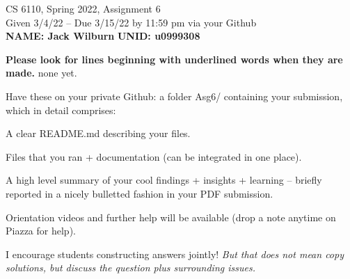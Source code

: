 \documentclass[11pt]{article}
\begin{document}

\newlength{\minpagw}
\settowidth{\minpagw}{\hspace{40em}}

\begin{center}
\begin{large}
  CS 6110, Spring 2022, Assignment 6  \\
  Given 3/4/22 -- Due 3/15/22 by 11:59 pm via your Github 
  \ \\
    {  {\Large\bf NAME: Jack Wilburn} \hfill {\Large\bf UNID: u0999308}\hspace{4cm} }
          \ \\
\end{large}

\end{center}

 {\bf Please look for lines beginning with underlined words when they are made.}
         {\tiny none yet.}

         Have these on your private Github:
         a folder Asg6/ containing your submission, which in detail comprises:
         \begin{compactitem}
         \item A clear README.md describing your files.
         \item Files that you ran + documentation (can be integrated in one place).
         \item A high level summary of your cool findings + insights + learning -- briefly reported in
           a nicely bulletted fashion in your PDF submission.
         \end{compactitem}

Orientation videos and further help will be available (drop a note anytime
on Piazza for help).

I encourage students constructing answers jointly! {\em But that does not
mean copy solutions, but discuss the question plus surrounding issues.}
\end{document}
